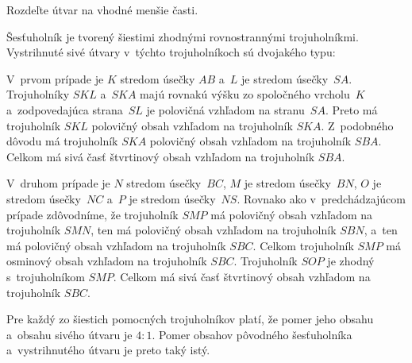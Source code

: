 {%
\napad
Rozdeľte útvar na vhodné menšie časti.

\riesenie
Šesťuholník je tvorený šiestimi zhodnými rovnostrannými trojuholníkmi.
Vystrihnuté sivé útvary v~týchto trojuholníkoch sú dvojakého typu:
%


V~prvom prípade je $K$ stredom úsečky $AB$ a~$L$ je stredom úsečky~$SA$.
Trojuholníky $SKL$ a~$SKA$ majú rovnakú výšku zo spoločného vrcholu~$K$ a~zodpovedajúca strana~$SL$ je polovičná vzhľadom na stranu~$SA$.
Preto má trojuholník $SKL$ polovičný obsah vzhľadom na trojuholník $SKA$.
Z~podobného dôvodu má trojuholník $SKA$ polovičný obsah vzhľadom na trojuholník $SBA$.
Celkom má sivá časť štvrtinový obsah vzhľadom na trojuholník $SBA$.

V~druhom prípade je $N$ stredom úsečky~$BC$, $M$ je stredom úsečky~$BN$, $O$ je stredom úsečky~$NC$ a~$P$ je stredom úsečky~$NS$.
Rovnako ako v~predchádzajúcom prípade zdôvodníme, že
trojuholník $SMP$ má polovičný obsah vzhľadom na trojuholník $SMN$, ten má polovičný obsah vzhľadom na trojuholník $SBN$, a~ten má polovičný obsah vzhľadom na trojuholník $SBC$.
Celkom trojuholník $SMP$ má osminový obsah vzhľadom na trojuholník $SBC$.
Trojuholník $SOP$ je zhodný s~trojuholníkom $SMP$.
Celkom má sivá časť štvrtinový obsah vzhľadom na trojuholník $SBC$.

Pre každý zo šiestich pomocných trojuholníkov platí, že pomer jeho obsahu a~obsahu sivého útvaru je $4:1$.
Pomer obsahov pôvodného šesťuholníka a~vystrihnutého útvaru je preto taký istý.
}

